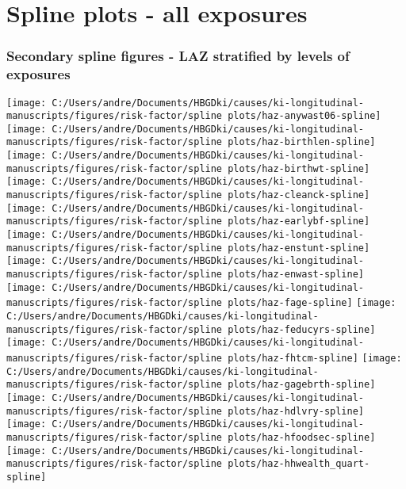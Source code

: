 \documentclass[9pt,]{book}
\begin{document}
\chapter{Spline plots - all exposures}\label{rf_splines}

\raggedright

\subsection{Secondary spline figures - LAZ stratified by levels of
exposures}\label{secondary-spline-figures---laz-stratified-by-levels-of-exposures}

\texttt{[image: C:/Users/andre/Documents/HBGDki/causes/ki-longitudinal-manuscripts/figures/risk-factor/spline plots/haz-anywast06-spline]}
\texttt{[image: C:/Users/andre/Documents/HBGDki/causes/ki-longitudinal-manuscripts/figures/risk-factor/spline plots/haz-birthlen-spline]}
\texttt{[image: C:/Users/andre/Documents/HBGDki/causes/ki-longitudinal-manuscripts/figures/risk-factor/spline plots/haz-birthwt-spline]}
\texttt{[image: C:/Users/andre/Documents/HBGDki/causes/ki-longitudinal-manuscripts/figures/risk-factor/spline plots/haz-cleanck-spline]}
\texttt{[image: C:/Users/andre/Documents/HBGDki/causes/ki-longitudinal-manuscripts/figures/risk-factor/spline plots/haz-earlybf-spline]}
\texttt{[image: C:/Users/andre/Documents/HBGDki/causes/ki-longitudinal-manuscripts/figures/risk-factor/spline plots/haz-enstunt-spline]}
\texttt{[image: C:/Users/andre/Documents/HBGDki/causes/ki-longitudinal-manuscripts/figures/risk-factor/spline plots/haz-enwast-spline]}
\texttt{[image: C:/Users/andre/Documents/HBGDki/causes/ki-longitudinal-manuscripts/figures/risk-factor/spline plots/haz-fage-spline]}
\texttt{[image: C:/Users/andre/Documents/HBGDki/causes/ki-longitudinal-manuscripts/figures/risk-factor/spline plots/haz-feducyrs-spline]}
\texttt{[image: C:/Users/andre/Documents/HBGDki/causes/ki-longitudinal-manuscripts/figures/risk-factor/spline plots/haz-fhtcm-spline]}
\texttt{[image: C:/Users/andre/Documents/HBGDki/causes/ki-longitudinal-manuscripts/figures/risk-factor/spline plots/haz-gagebrth-spline]}
\texttt{[image: C:/Users/andre/Documents/HBGDki/causes/ki-longitudinal-manuscripts/figures/risk-factor/spline plots/haz-hdlvry-spline]}
\texttt{[image: C:/Users/andre/Documents/HBGDki/causes/ki-longitudinal-manuscripts/figures/risk-factor/spline plots/haz-hfoodsec-spline]}
\texttt{[image: C:/Users/andre/Documents/HBGDki/causes/ki-longitudinal-manuscripts/figures/risk-factor/spline plots/haz-hhwealth\_quart-spline]}
\end{document}
